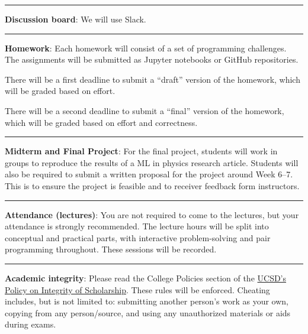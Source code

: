 \documentclass[12pt]{article}
\begin{document}
\begin{center}
  \rule{\textwidth}{0.5pt}
\end{center}

\noindent\textbf{Discussion board}: We will use Slack.

\begin{center}
  \rule{\textwidth}{0.5pt}
\end{center}

\noindent\textbf{Homework}: Each homework will consist of a set of programming challenges.
The assignments will be submitted as Jupyter notebooks or GitHub repositories.

There will be a first deadline to submit a ``draft'' version of the homework, which will be graded based on effort.

There will be a second deadline to submit a ``final'' version of the homework, which will be graded based on effort and correctness.

\begin{center}
  \rule{\textwidth}{0.5pt}
\end{center}

\noindent\textbf{Midterm and Final Project}:
For the final project, students will work in groups to reproduce the results of a ML in physics research article.
Students will also be required to submit a written proposal for the project around Week 6--7.
This is to ensure the project is feasible and to receiver feedback form instructors.

\begin{center}
  \rule{\textwidth}{0.5pt}
\end{center}

\noindent\textbf{Attendance (lectures)}: You are not required to come to the lectures, but your attendance is strongly recommended.
The lecture hours will be split into conceptual and practical parts, with interactive problem-solving and pair programming throughout.
These sessions will be recorded.

\begin{center}
  \rule{\textwidth}{0.5pt}
\end{center}

\noindent\textbf{Academic integrity}: Please read the College Policies section of the \href{http://senate.ucsd.edu/Operating-Procedures/Senate-Manual/Appendices/2}{UCSD’s Policy on Integrity of Scholarship}.
These rules will be enforced.
Cheating includes, but is not limited to: submitting another person's work as your own, copying from any person/source, and using any unauthorized materials or aids during exams.
\end{document}
